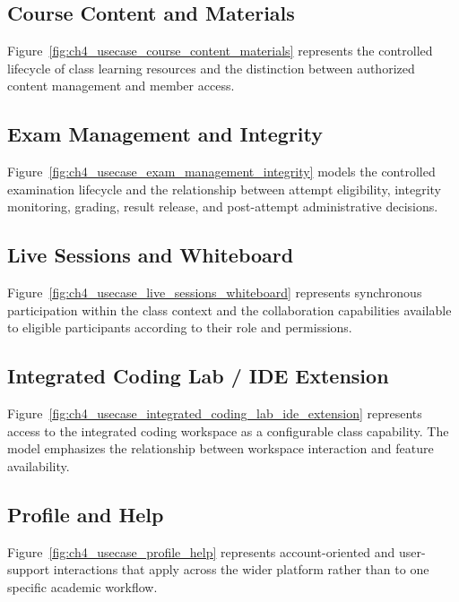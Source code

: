 \begin{samepage}
\subsection*{Course Content and Materials}

Figure~\ref{fig:ch4_usecase_course_content_materials} represents the controlled
lifecycle of class learning resources and the distinction between authorized
content management and member access.
\end{samepage}

\begin{samepage}
\subsection*{Exam Management and Integrity}

Figure~\ref{fig:ch4_usecase_exam_management_integrity} models the controlled
examination lifecycle and the relationship between attempt eligibility,
integrity monitoring, grading, result release, and post-attempt administrative
decisions.
\end{samepage}

\begin{samepage}
\subsection*{Live Sessions and Whiteboard}

Figure~\ref{fig:ch4_usecase_live_sessions_whiteboard} represents synchronous
participation within the class context and the collaboration capabilities
available to eligible participants according to their role and permissions.
\end{samepage}

\begin{samepage}
\subsection*{Integrated Coding Lab / IDE Extension}

Figure~\ref{fig:ch4_usecase_integrated_coding_lab_ide_extension} represents
access to the integrated coding workspace as a configurable class capability.
The model emphasizes the relationship between workspace interaction and
feature availability.
\end{samepage}

\begin{samepage}
\subsection*{Profile and Help}

Figure~\ref{fig:ch4_usecase_profile_help} represents account-oriented and
user-support interactions that apply across the wider platform rather than to
one specific academic workflow.
\end{samepage}

